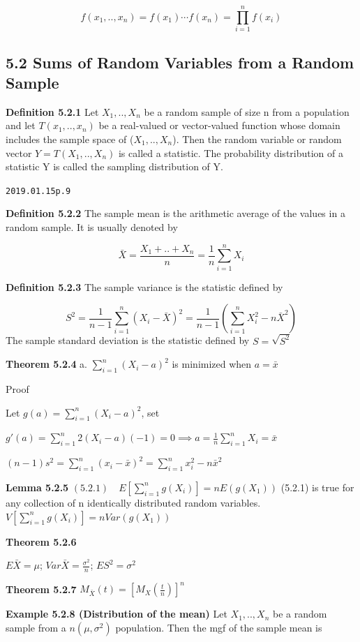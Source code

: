 \documentclass[6pt,twocolumn,Portrait]{article}
\begin{document}
\[f(x_1,..,x_n) =f(x_1)\cdots f(x_n)=\prod_{i=1}^nf(x_i)\]

\hypertarget{sums-of-random-variables-from-a-random-sample}{%
\subsection{5.2 Sums of Random Variables from a Random
Sample}\label{sums-of-random-variables-from-a-random-sample}}

\textbf{Definition 5.2.1} Let \(X_1,..,X_n\) be a random sample of size
n from a population and let \(T(x_1,..,x_n)\) be a real-valued or
vector-valued function whose domain includes the sample space of
(\(X_1,..,X_n\)). Then the random variable or random vector
\(Y=T(X_1,..,X_n)\) is called a statistic. The probability distribution
of a statistic Y is called the sampling distribution of Y.

\texttt{2019.01.15\textasciigrave{}\textasciigrave{}p.9}

\textbf{Definition 5.2.2} The sample mean is the arithmetic average of
the values in a random sample. It is usually denoted by

\[\bar X=\frac{X_1+..+X_n}{n}=\frac1n\sum_{i=1}^nX_i\]

\textbf{Definition 5.2.3} The sample variance is the statistic defined
by

\[S^2=\frac1{n-1}\sum_{i=1}^n(X_i-\bar X)^2=\frac1{n-1}(\sum_{i=1}^nX_i^2-n\bar X^2)\]
The sample standard deviation is the statistic defined by
\(S=\sqrt{S^2}\)

\textbf{Theorem 5.2.4} a. \(\sum_{i=1}^n(X_i-a)^2\) is minimized when
\(a=\bar x\)

Proof

Let \(g(a)=\sum_{i=1}^n(X_i-a)^2\), set

\(g'(a)=\sum_{i=1}^n2(X_i-a)(-1)=0\implies a=\frac1n\sum_{i=1}^nX_i=\bar x\)

\((n-1)s^2=\sum_{i=1}^n(x_i-\bar x)^2=\sum_{i=1}^nx_i^2-n\bar x^2\)

\textbf{Lemma 5.2.5} \((5.2.1)\quad E[\sum_{i=1}^ng(X_i)]=nE(g(X_1))\)
(5.2.1) is true for any collection of n identically distributed random
variables. \(V[\sum_{i=1}^ng(X_i)]=nVar(g(X_1))\)

\textbf{Theorem 5.2.6}

\(E\bar X=\mu\); \(Var\bar X=\frac{\sigma^2}n\); \(ES^2=\sigma^2\)

\textbf{Theorem 5.2.7} \(M_{\bar X}(t)=[M_X(\frac{t}n)]^n\)

\textbf{Example 5.2.8 (Distribution of the mean)} Let \(X_1,..,X_n\) be
a random sample from a \(n(\mu,\sigma^2)\) population. Then the mgf of
the sample mean is
\end{document}

